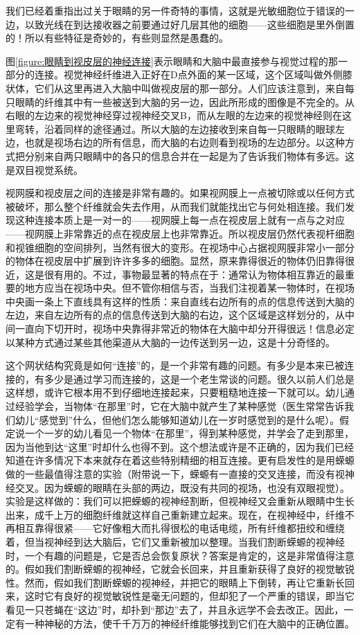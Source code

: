我们已经着重指出过关于眼睛的另一件奇特的事情，这就是光敏细胞位于错误的一边，以致光线在到达接收器之前要通过好几层其他的细胞——这些细胞是里外倒置的！所以有些特征是奇妙的，有些则显然是愚蠢的。

图\ref{figure:眼睛到视皮层的神经连接}表示眼睛和大脑中最直接参与视觉过程的那一部分的连接。视觉神经纤维进入正好在D点外面的某一区域，这个区域叫做外侧膝状体，它们从这里再进入大脑中叫做视皮层的那一部分。人们应该注意到，来自每只眼睛的纤维其中有一些被送到大脑的另一边，因此所形成的图像是不完全的。从右眼的左边来的视觉神经穿过视神经交叉B，而从左眼的左边来的视觉神经则在这里弯转，沿着同样的途径通过。所以大脑的左边接收到来自每一只眼睛的眼球左边，也就是视场右边的所有信息，而大脑的右边则看到视场的左边部分。以这种方式把分别来自两只眼睛中的各只的信息合并在一起是为了告诉我们物体有多远。这是双目视觉系统。

视网膜和视皮层之间的连接是非常有趣的。如果视网膜上一点被切除或以任何方式被破坏，那么整个纤维就会失去作用，从而我们就能找出它与何处相连接。我们发现这种连接本质上是一对一的——视网膜上每一点在视皮层上就有一点与之对应——视网膜上非常靠近的点在视皮层上也非常靠近。所以视皮层仍然代表视杆细胞和视锥细胞的空间排列，当然有很大的变形。在视场中心占据视网膜非常小一部分的物体在视皮层中扩展到许许多多的细胞。显然，原来靠得很近的物体仍旧靠得很近，这是很有用的。不过，事物最显著的特点在于：通常认为物体相互靠近的最重要的地方应当在视场中央。但不管你相信与否，当我们注视着某一物体时，在视场中央画一条上下直线具有这样的性质：来自直线右边所有的点的信息传送到大脑的左边，来自左边所有的点的信息传送到大脑的右边，这个区域是这样划分的，从中间一直向下切开时，视场中央靠得非常近的物体在大脑中却分开得很远！信息必定以某种方式通过某些其他渠道从大脑的一边传送到另一边，这是十分奇怪的。

这个网状结构究竟是如何“连接”的，是一个非常有趣的问题。有多少是本来已被连接的，有多少是通过学习而连接的，这是一个老生常谈的问题。很久以前人们总是这样想，或许它根本用不到仔细地连接起来，只要粗糙地连接一下就可以。幼儿通过经验学会，当物体“在那里”时，它在大脑中就产生了某种感觉（医生常常告诉我们幼儿“感觉到”什么，但他们怎么能够知道幼儿在一岁时感觉到的是什么呢）。假定说一个一岁的幼儿看见一个物体“在那里”，得到某种感觉，并学会了走到那里，因为当他到达“这里”时却什么也得不到。这个想法或许是不正确的，因为我们已经知道在许多情况下本来就存在着这些特别精细的相互连接。更有启发性的是用蝾螈做的一些最值得注意的实验（附带说一下，蝾螈有一直接的交叉连接，而没有视神经交叉。因为蝾螈的眼睛在头部的两边，既没有共同的视场，也没有双眼视觉）。实验是这样做的：我们可以把蝾螈的视神经割断，但视神经又会重新从眼睛中生长出来，成千上万的细胞纤维就这样自己重新建立起来。现在，在视神经中，纤维不再相互靠得很紧——它好像粗大而扎得很松的电话电缆，所有纤维都扭绞和缠绕着，但当视神经到达大脑后，它们又重新被加以整理。当我们割断蝾螈的视神经时，一个有趣的问题是，它是否总会恢复原状？答案是肯定的，这是非常值得注意的。假如我们割断蝾螈的视神经，它就会长回来，并且重新获得了良好的视觉敏锐性。然而，假如我们割断蝾螈的视神经，并把它的眼睛上下倒转，再让它重新长回来，这时它有良好的视觉敏锐性是毫无问题的，但却犯了一个严重的错误，即当它看见一只苍蝇在“这边”时，却扑到“那边”去了，并且永远学不会去改正。因此，一定有一种神秘的方法，使千千万万的神经纤维能够找到它们在大脑中的正确位置。

